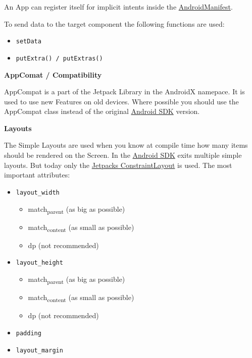 \documentclass[11pt,twoside,landscape]{article}
\begin{document}
\begin{multicols}{3}
An App can register itself for implicit intents inside the \href{../../../roam/20210921175054-androidmanifest.org}{AndroidManifest}.

To send data to the target component the following functions are used:
\begin{itemize}
\item \texttt{setData}
\item \texttt{putExtra() / putExtras()}
\end{itemize}


\textbf{AppComat / Compatibility}

AppCompat is a part of the Jetpack Library in the AndroidX namepace.
It is used to use new Features on old devices.
Where possible you should use the AppCompat class instead of the original \href{../../../roam/20210928175951-android_sdk.org}{Android SDK} version.


\textbf{Layouts}

The Simple Layouts are used when you know at compile time how many items should be rendered on the Screen.
In the \href{../../../roam/20210928175951-android_sdk.org}{Android SDK} exits multiple simple layouts. But today only the \href{../../../roam/20211017134616-jetpacks_constraintlayout.org}{Jetpacks ConstraintLayout} is used.
The most important attributes:
\begin{itemize}
\item \texttt{layout\_width}
\begin{itemize}
\item match\textsubscript{parent} (as big as possible)
\item match\textsubscript{content} (as small as possible)
\item dp (not recommended)
\end{itemize}
\item \texttt{layout\_height}
\begin{itemize}
\item match\textsubscript{parent} (as big as possible)
\item match\textsubscript{content} (as small as possible)
\item dp (not recommended)
\end{itemize}
\item \texttt{padding}
\item \texttt{layout\_margin}
\end{itemize}


\end{multicols}
\end{document}
